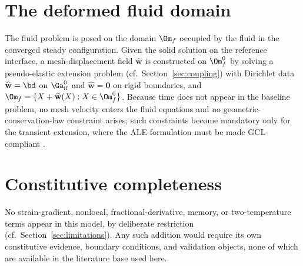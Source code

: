 \section{The deformed fluid domain}
\label{sec:ale}
The fluid problem is posed on the domain $\Om_f$ occupied by the fluid in the converged steady
configuration. Given the solid solution on the reference interface, a mesh-displacement field
$\widehat{\mathbf w}$ is constructed on $\Om_f^0$ by solving a pseudo-elastic extension problem
(cf.\ Section~\ref{sec:coupling}) with Dirichlet data $\widehat{\mathbf w}=\bd$ on
$\Ga_{\mathrm{if}}^0$ and $\widehat{\mathbf w}=\mathbf 0$ on rigid boundaries, and
$\Om_f=\{X+\widehat{\mathbf w}(X):X\in\Om_f^0\}$. Because time does not appear in the baseline
problem, no mesh velocity enters the fluid equations and no geometric-conservation-law constraint
arises; such constraints become mandatory only for the transient extension, where the ALE
formulation must be made GCL-compliant \cite{lesoinne1996geometric}.

\section{Constitutive completeness}
No strain-gradient, nonlocal, fractional-derivative, memory, or two-temperature terms appear in
this model, by deliberate restriction (cf.\ Section~\ref{sec:limitations}). Any such addition would
require its own constitutive evidence, boundary conditions, and validation objects, none of which
are available in the literature base used here.
